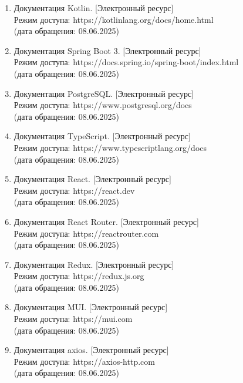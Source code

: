 \documentclass[14pt]{extarticle}
\begin{document}
\begin{enumerate}
    \item Документация Kotlin. [Электронный ресурс]\\
    Режим доступа: https://kotlinlang.org/docs/home.html\\
    (дата обращения: 08.06.2025)
    
    \item Документация Spring Boot 3. [Электронный ресурс]\\
    Режим доступа: https://docs.spring.io/spring-boot/index.html\\
    (дата обращения: 08.06.2025)
    
    \item Документация PostgreSQL. [Электронный ресурс]\\
    Режим доступа: https://www.postgresql.org/docs\\
    (дата обращения: 08.06.2025)
    
    \item Документация TypeScript. [Электронный ресурс]\\
    Режим доступа: https://www.typescriptlang.org/docs\\
    (дата обращения: 08.06.2025)

    \item Документация React. [Электронный ресурс]\\
    Режим доступа: https://react.dev\\
    (дата обращения: 08.06.2025)

    \item Документация React Router. [Электронный ресурс]\\
    Режим доступа: https://reactrouter.com\\
    (дата обращения: 08.06.2025)

    \item Документация Redux. [Электронный ресурс]\\
    Режим доступа: https://redux.js.org\\
    (дата обращения: 08.06.2025)

    \item Документация MUI. [Электронный ресурс]\\
    Режим доступа: https://mui.com\\
    (дата обращения: 08.06.2025)

    \item Документация axios. [Электронный ресурс]\\
    Режим доступа: https://axios-http.com\\
    (дата обращения: 08.06.2025)


\end{enumerate}
\end{document}
